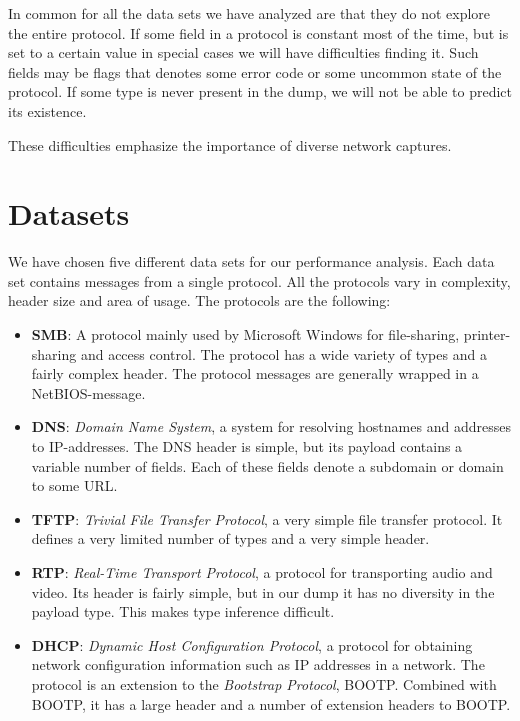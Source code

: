 \documentclass[a4paper]{report}
\begin{document}
In common for all the data sets we have analyzed are that they do not explore
the entire protocol. If some field in a protocol is constant most of the time,
but is set to a certain value in special cases we will have difficulties
finding it. Such fields may be flags that denotes some error code or some
uncommon state of the protocol. If some type is never present in the dump,
we will not be able to predict its existence.

These difficulties emphasize the importance of diverse network captures.

\section{Datasets}
We have chosen five different data sets for our performance analysis. Each
data set contains messages from a single protocol. All the protocols vary
in complexity, header size and area of usage. The protocols are the following:

\begin{itemize}
    \item \textbf{SMB}: A protocol mainly used by Microsoft Windows for 
        file-sharing, printer-sharing and access control. The protocol
        has a wide variety of types and a fairly complex header. The protocol
        messages are generally wrapped in a NetBIOS-message.
    \item \textbf{DNS}: \emph{Domain Name System}, a system for resolving
        hostnames and addresses to IP-addresses. The DNS header is simple,
        but its payload contains a variable number of fields. Each of these
        fields denote a subdomain or domain to some URL.
    \item \textbf{TFTP}: \emph{Trivial File Transfer Protocol}, a very simple
        file transfer protocol. It defines a very limited number of types
        and a very simple header.
    \item \textbf{RTP}: \emph{Real-Time Transport Protocol}, a protocol for
        transporting audio and video. Its header is fairly simple, but in our
        dump it has no diversity in the payload type. This makes type
        inference difficult.
    \item \textbf{DHCP}: \emph{Dynamic Host Configuration Protocol}, a
        protocol for obtaining network configuration information such as
        IP addresses in a network. The protocol is an extension to the
        \emph{Bootstrap Protocol}, BOOTP. Combined with BOOTP, it has a large
        header and a number of extension headers to BOOTP.
\end{itemize}
\end{document}
